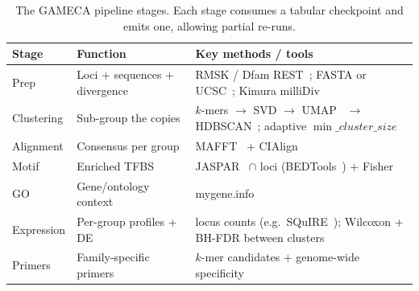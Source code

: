 \documentclass[11pt]{article}
\begin{document}
\begin{table}[h]
  \centering
  \small
  \begin{tabular}{@{}lll@{}}
    \toprule
    \textbf{Stage} & \textbf{Function} & \textbf{Key methods / tools} \\
    \midrule
    Prep        & Loci + sequences + divergence & RMSK / Dfam REST~\citep{hubley2016}; FASTA or UCSC~\citep{kent2002ucsc}; Kimura milliDiv \\
    Clustering  & Sub-group the copies          & $k$-mers $\to$ SVD $\to$ UMAP~\citep{mcinnes2018umap} $\to$ HDBSCAN~\citep{mcinnes2017hdbscan}; adaptive $\min\_cluster\_size$ \\
    Alignment   & Consensus per group           & MAFFT~\citep{katoh2002mafft} + CIAlign~\citep{tumescheit2022cialign} \\
    Motif       & Enriched TFBS                 & JASPAR~\citep{castromondragon2022jaspar} $\cap$ loci (BEDTools~\citep{quinlan2010bedtools}) + Fisher \\
    GO          & Gene/ontology context         & mygene.info~\citep{xin2016mygene} \\
    Expression  & Per-group profiles + DE       & locus counts (e.g.\ SQuIRE~\citep{yang2019squire}); Wilcoxon + BH-FDR between clusters \\
    Primers     & Family-specific primers       & $k$-mer candidates + genome-wide specificity \\
    \bottomrule
  \end{tabular}
  \caption{The GAMECA pipeline stages. Each stage consumes a tabular checkpoint and emits
    one, allowing partial re-runs.}
  \label{tab:stages}
\end{table}
\end{document}
